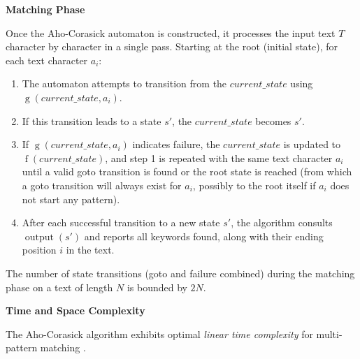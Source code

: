 \textbf{Matching Phase}

Once the Aho-Corasick automaton is constructed, it processes the input text $T$ character by character in a single pass. Starting at the root (initial state), for each text character $a_i$:
\begin{enumerate}
    \item The automaton attempts to transition from the $\textit{current\_state}$ using $\operatorname{g}(\textit{current\_state}, a_i)$.
    \item If this transition leads to a state $s'$, the $\textit{current\_state}$ becomes $s'$.
    \item If $\operatorname{g}(\textit{current\_state}, a_i)$ indicates failure, the $\textit{current\_state}$ is updated to $\operatorname{f}(\textit{current\_state})$, and step 1 is repeated with the same text character $a_i$ until a valid goto transition is found or the root state is reached (from which a goto transition will always exist for $a_i$, possibly to the root itself if $a_i$ does not start any pattern).
    \item After each successful transition to a new state $s'$, the algorithm consults $\operatorname{output}(s')$ and reports all keywords found, along with their ending position $i$ in the text.
\end{enumerate}
The number of state transitions (goto and failure combined) during the matching phase on a text of length $N$ is bounded by $2N$.

\textbf{Time and Space Complexity}

The Aho-Corasick algorithm exhibits optimal \textit{linear time complexity} for multi-pattern matching \cite{AhoCorasick1975, Gusfield1997}.

